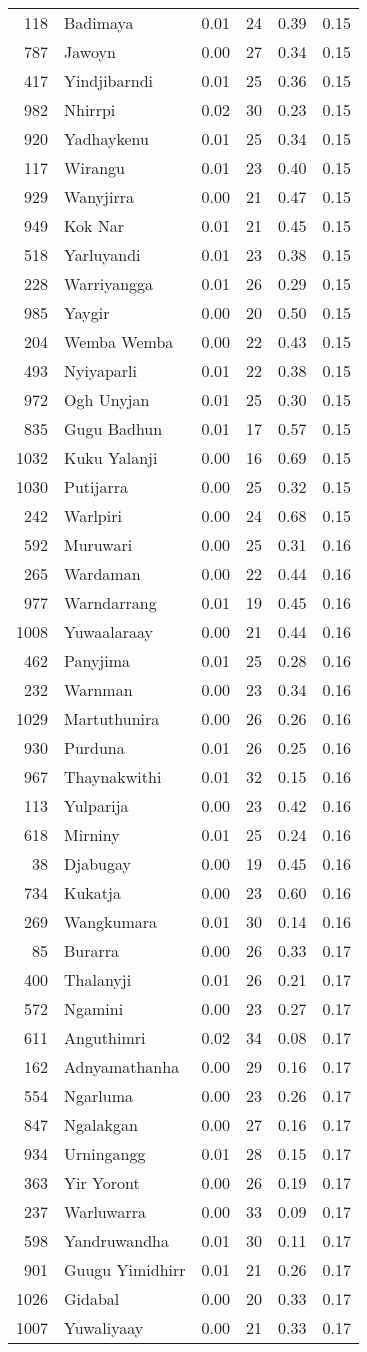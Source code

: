\begin{longtable}[]{@{}rlrrrr@{}}
118 & Badimaya & 0.01 & 24 & 0.39 & 0.15\tabularnewline
787 & Jawoyn & 0.00 & 27 & 0.34 & 0.15\tabularnewline
417 & Yindjibarndi & 0.01 & 25 & 0.36 & 0.15\tabularnewline
982 & Nhirrpi & 0.02 & 30 & 0.23 & 0.15\tabularnewline
920 & Yadhaykenu & 0.01 & 25 & 0.34 & 0.15\tabularnewline
117 & Wirangu & 0.01 & 23 & 0.40 & 0.15\tabularnewline
929 & Wanyjirra & 0.00 & 21 & 0.47 & 0.15\tabularnewline
949 & Kok Nar & 0.01 & 21 & 0.45 & 0.15\tabularnewline
518 & Yarluyandi & 0.01 & 23 & 0.38 & 0.15\tabularnewline
228 & Warriyangga & 0.01 & 26 & 0.29 & 0.15\tabularnewline
985 & Yaygir & 0.00 & 20 & 0.50 & 0.15\tabularnewline
204 & Wemba Wemba & 0.00 & 22 & 0.43 & 0.15\tabularnewline
493 & Nyiyaparli & 0.01 & 22 & 0.38 & 0.15\tabularnewline
972 & Ogh Unyjan & 0.01 & 25 & 0.30 & 0.15\tabularnewline
835 & Gugu Badhun & 0.01 & 17 & 0.57 & 0.15\tabularnewline
1032 & Kuku Yalanji & 0.00 & 16 & 0.69 & 0.15\tabularnewline
1030 & Putijarra & 0.00 & 25 & 0.32 & 0.15\tabularnewline
242 & Warlpiri & 0.00 & 24 & 0.68 & 0.15\tabularnewline
592 & Muruwari & 0.00 & 25 & 0.31 & 0.16\tabularnewline
265 & Wardaman & 0.00 & 22 & 0.44 & 0.16\tabularnewline
977 & Warndarrang & 0.01 & 19 & 0.45 & 0.16\tabularnewline
1008 & Yuwaalaraay & 0.00 & 21 & 0.44 & 0.16\tabularnewline
462 & Panyjima & 0.01 & 25 & 0.28 & 0.16\tabularnewline
232 & Warnman & 0.00 & 23 & 0.34 & 0.16\tabularnewline
1029 & Martuthunira & 0.00 & 26 & 0.26 & 0.16\tabularnewline
930 & Purduna & 0.01 & 26 & 0.25 & 0.16\tabularnewline
967 & Thaynakwithi & 0.01 & 32 & 0.15 & 0.16\tabularnewline
113 & Yulparija & 0.00 & 23 & 0.42 & 0.16\tabularnewline
618 & Mirniny & 0.01 & 25 & 0.24 & 0.16\tabularnewline
38 & Djabugay & 0.00 & 19 & 0.45 & 0.16\tabularnewline
734 & Kukatja & 0.00 & 23 & 0.60 & 0.16\tabularnewline
269 & Wangkumara & 0.01 & 30 & 0.14 & 0.16\tabularnewline
85 & Burarra & 0.00 & 26 & 0.33 & 0.17\tabularnewline
400 & Thalanyji & 0.01 & 26 & 0.21 & 0.17\tabularnewline
572 & Ngamini & 0.00 & 23 & 0.27 & 0.17\tabularnewline
611 & Anguthimri & 0.02 & 34 & 0.08 & 0.17\tabularnewline
162 & Adnyamathanha & 0.00 & 29 & 0.16 & 0.17\tabularnewline
554 & Ngarluma & 0.00 & 23 & 0.26 & 0.17\tabularnewline
847 & Ngalakgan & 0.00 & 27 & 0.16 & 0.17\tabularnewline
934 & Urningangg & 0.01 & 28 & 0.15 & 0.17\tabularnewline
363 & Yir Yoront & 0.00 & 26 & 0.19 & 0.17\tabularnewline
237 & Warluwarra & 0.00 & 33 & 0.09 & 0.17\tabularnewline
598 & Yandruwandha & 0.01 & 30 & 0.11 & 0.17\tabularnewline
901 & Guugu Yimidhirr & 0.01 & 21 & 0.26 & 0.17\tabularnewline
1026 & Gidabal & 0.00 & 20 & 0.33 & 0.17\tabularnewline
1007 & Yuwaliyaay & 0.00 & 21 & 0.33 & 0.17\tabularnewline

\end{longtable}
